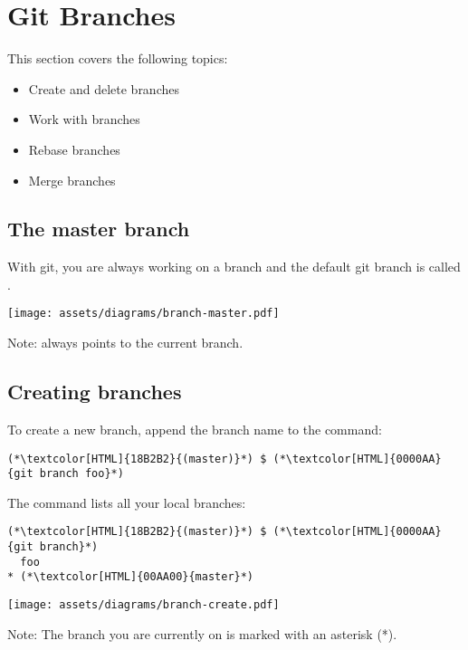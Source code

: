 \section{Git Branches}
\begin{frame}[fragile]
  \slidetitle

  This section covers the following topics:
  \begin{itemize}
    \item Create and delete branches
    \item Work with branches
    \item Rebase branches
    \item Merge branches
  \end{itemize}
\end{frame}

\subsection{The master branch}
\begin{frame}[fragile]
  \subslidetitle

  With git, you are always working on a branch and the default git branch is called .
  \newline \vspace{1em}
  \centerline{\texttt{[image: assets/diagrams/branch-master.pdf]}}

  \vspace{1.2em}
  Note:  always points to the current branch.

\end{frame}

\subsection{Creating branches}
\begin{frame}[fragile]
  \subslidetitle

  To create a new  branch, append the branch name to the  command:
  \begin{lstlisting}
(*\textcolor[HTML]{18B2B2}{(master)}*) $ (*\textcolor[HTML]{0000AA}{git branch foo}*)
\end{lstlisting}

  The  command lists all your local branches:
  \begin{lstlisting}
(*\textcolor[HTML]{18B2B2}{(master)}*) $ (*\textcolor[HTML]{0000AA}{git branch}*)
  foo
* (*\textcolor[HTML]{00AA00}{master}*)
\end{lstlisting}
  \vspace{1em}
  \centerline{\texttt{[image: assets/diagrams/branch-create.pdf]}}
  \vspace{1em}
  Note: The branch you are currently on is marked with an asterisk (*).
\end{frame}

